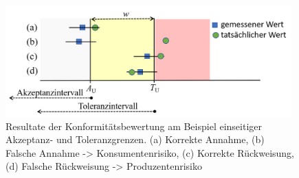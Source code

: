 \begin{figure}[!htp]
	\begin{center}
		\includegraphics[width=110mm]{05_vorlesung/media/Resultate_der_KFB.png}
		\caption{\label{fig:Resultate_Konformtitaetsbewertung} Resultate der Konformitätsbewertung am Beispiel einseitiger Akzeptanz- und Toleranzgrenzen. (a) Korrekte Annahme, (b) Falsche Annahme -> Konsumentenrisiko, (c) Korrekte Rückweisung, (d) Falsche Rückweisung -> Produzentenrisiko}
	\end{center}
\end{figure}

